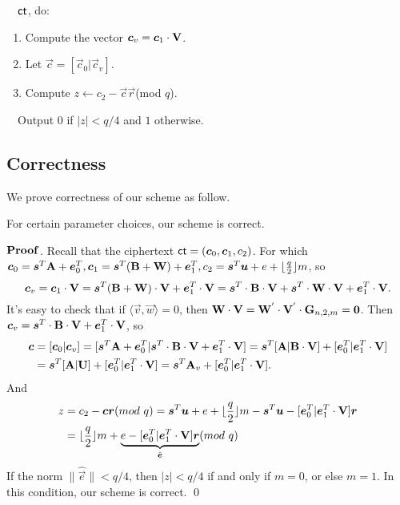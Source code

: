 ~~$\mathsf{ct}$, do:
\begin{enumerate}
\item Compute the vector $\boldsymbol{c}_{v}=\boldsymbol{c}_{1}\cdot \mathbf{V}$.\\
\item Let $\vec{c}=[\vec{c}_{0}|\vec{c}_{v}]$.\\
\item Compute $ z\leftarrow c_{2}-\vec{c}\vec{r}$(mod $q$).
\end{enumerate}
~~Output $0$ if $|z|<q/4$ and $1$ otherwise.

\subsection{Correctness}
We prove correctness of our scheme as follow.
\begin{lemma}
For certain parameter choices, our scheme is correct.
\end{lemma}
\noindent $\mathbf{Proof}$. Recall that the ciphertext $\mathsf{ct}=(\boldsymbol{c}_{0},\boldsymbol{c}_{1},c_{2})$. For which $\boldsymbol{c}_{0}=\boldsymbol{s}^{T}\mathbf{A}+\boldsymbol{e}^{T}_{0},  \boldsymbol{c}_{1}=\boldsymbol{s}^{T}(\mathbf{B}+\mathbf{W})+\boldsymbol{e}^{T}_{1}, c_{2}=\boldsymbol{s}^{T}\boldsymbol{u}+e+\lfloor \frac{q}{2} \rfloor m$, so
\begin{equation}
\boldsymbol{c}_{v}=\boldsymbol{c}_{1}\cdot \mathbf{V}=\boldsymbol{s}^{T}(\mathbf{B}+\mathbf{W})\cdot \mathbf{V}+\boldsymbol{e}^{T}_{1}\cdot \mathbf{V}=\boldsymbol{s}^{T}\cdot \mathbf{B}\cdot \mathbf{V}+\boldsymbol{s}^{T}\cdot \mathbf{W}\cdot \mathbf{V}+
\boldsymbol{e}^{T}_{1}\cdot \mathbf{V}.
\end{equation}
It's easy to check that if $\langle \vec{v},\vec{w} \rangle=0$, then $\mathbf{W}\cdot \mathbf{V}=\mathbf{W}^{'}\cdot \mathbf{V}^{'}\cdot \mathbf{G}_{n,2,m}=\mathbf{0}$. Then $\boldsymbol{c}_{v}=\boldsymbol{s}^{T}\cdot \mathbf{B}\cdot \mathbf{V}+\boldsymbol{e}^{T}_{1}\cdot \mathbf{V}$, so
\begin{equation}
\begin{aligned}
\boldsymbol{c}&=[\boldsymbol{c}_{0}|\boldsymbol{c}_{v}]=[\boldsymbol{s}^{T}\mathbf{A}+\boldsymbol{e}^{T}_{0}|\boldsymbol{s}^{T}\cdot \mathbf{B}\cdot \mathbf{V}+\boldsymbol{e}^{T}_{1}\cdot \mathbf{V}]=\boldsymbol{s}^{T}[\mathbf{A}|\mathbf{B}\cdot \mathbf{V}]+[\boldsymbol{e}^{T}_{0}|\boldsymbol{e}^{T}_{1}\cdot \mathbf{V}]\\
&=\boldsymbol{s}^{T}[\mathbf{A}|\mathbf{U}]+[\boldsymbol{e}^{T}_{0}|\boldsymbol{e}^{T}_{1}\cdot \mathbf{V}]=\boldsymbol{s}^{T}\mathbf{A}_{v}+[\boldsymbol{e}^{T}_{0}|\boldsymbol{e}^{T}_{1}\cdot \mathbf{V}].
\end{aligned}
\end{equation}
And
\begin{equation}
\begin{aligned}
z&=c_{2}-\boldsymbol{c}\boldsymbol{r}(mod\ q)=\boldsymbol{s}^{T}\boldsymbol{u}+e+\lfloor \frac{q}{2} \rfloor m-\boldsymbol{s}^{T}\boldsymbol{u}-[\boldsymbol{e}^{T}_{0}|\boldsymbol{e}^{T}_{1}\cdot \mathbf{V}]\boldsymbol{r}\\
&=\lfloor \frac{q}{2} \rfloor m+\underbrace{e-[\boldsymbol{e}^{T}_{0}|\boldsymbol{e}^{T}_{1}\cdot \mathbf{V}]\boldsymbol{r}}_{\hat{\boldsymbol{e}}}(mod\ q)
\end{aligned}
\end{equation}
If the norm $\|\hat{\vec{e}}\|< q/4$, then $|z|< q/4$ if and only if $m=0$, or else $m=1$. In this condition, our scheme is correct.  \qed
